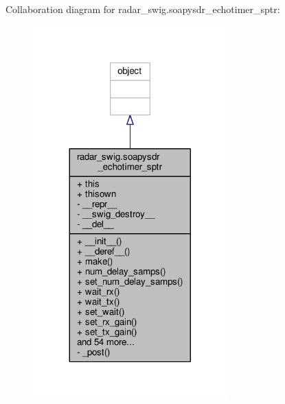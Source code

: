Collaboration diagram for radar\+\_\+swig.\+soapysdr\+\_\+echotimer\+\_\+sptr\+:
\nopagebreak
\begin{figure}[H]
\begin{center}
\leavevmode
\includegraphics[width=212pt]{d0/d46/classradar__swig_1_1soapysdr__echotimer__sptr__coll__graph}
\end{center}
\end{figure}
